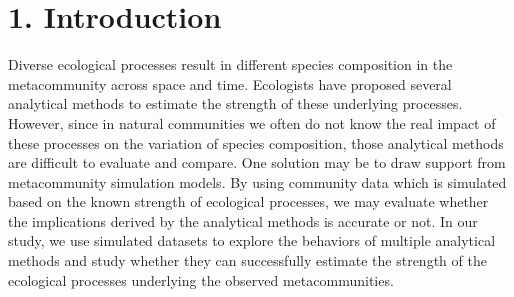 
\chapter*{1. Introduction}
\setcounter{chapter}{1}
\noindent
Diverse ecological processes result in different species composition in the metacommunity across space and time. Ecologists have proposed several analytical methods to estimate the strength of these underlying processes. However, since in natural communities we often do not know the real impact of these processes on the variation of species composition, those analytical methods are difficult to evaluate and compare. One solution may be to draw support from metacommunity simulation models. By using community data which is simulated based on the known strength of ecological processes, we may evaluate whether the implications derived by the analytical methods is accurate or not. In our study, we use simulated datasets to explore the behaviors of multiple analytical methods and study whether they can successfully estimate the strength of the ecological processes underlying the observed metacommunities.

